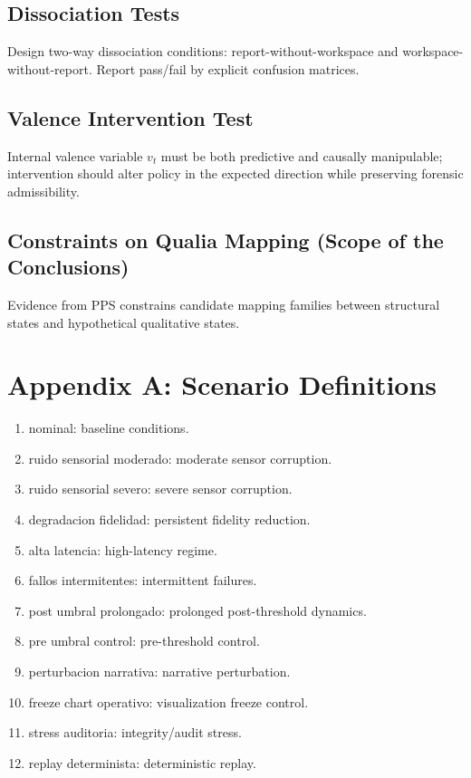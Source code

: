 \documentclass[11pt,a4paper]{article}
\theoremstyle{definition}
\begin{document}
\subsection{Dissociation Tests}
Design two-way dissociation conditions: report-without-workspace and workspace-without-report. Report pass/fail by explicit confusion matrices.

\subsection{Valence Intervention Test}
Internal valence variable $v_t$ must be both predictive and causally manipulable; intervention should alter policy in the expected direction while preserving forensic admissibility.

\subsection{Constraints on Qualia Mapping (Scope of the Conclusions)}
Evidence from PPS constrains candidate mapping families between structural states and hypothetical qualitative states. 

\appendix
\section{Appendix A: Scenario Definitions}
\begin{enumerate}
\item nominal: baseline conditions.
\item ruido sensorial moderado: moderate sensor corruption.
\item ruido sensorial severo: severe sensor corruption.
\item degradacion fidelidad: persistent fidelity reduction.
\item alta latencia: high-latency regime.
\item fallos intermitentes: intermittent failures.
\item post umbral prolongado: prolonged post-threshold dynamics.
\item pre umbral control: pre-threshold control.
\item perturbacion narrativa: narrative perturbation.
\item freeze chart operativo: visualization freeze control.
\item stress auditoria: integrity/audit stress.
\item replay determinista: deterministic replay.
\end{enumerate}
\end{document}
